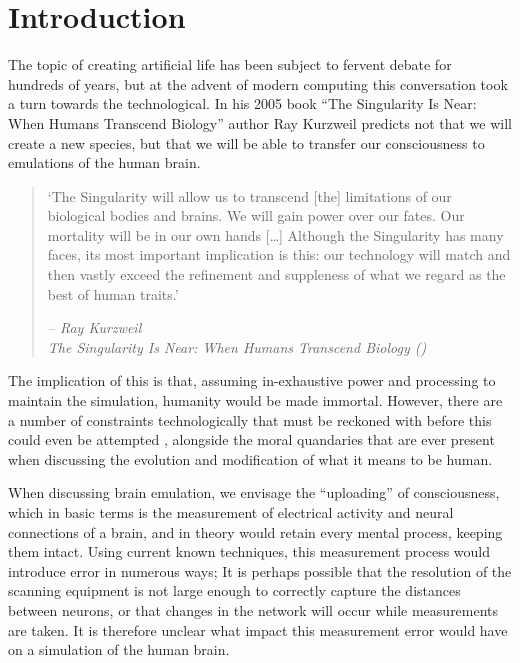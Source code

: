 \chapter{Introduction}


The topic of creating artificial life has been subject to fervent debate for
hundreds of years, but at the advent of modern computing this conversation took
a turn towards the technological. In his 2005 book “The Singularity Is Near:
When Humans Transcend Biology” author Ray Kurzweil predicts not that we will
create a new species, but that we will be able to transfer our
consciousness to emulations of the human brain.\autocite{kurzweil_singularity_2006}

\begin{quote}
      `The Singularity will allow us to transcend [the] limitations of our
      biological bodies and brains. We will gain power over our fates. Our
      mortality will be in our own hands [\ldots] Although the Singularity has many faces, its most important implication is this: our technology will match and then vastly exceed the refinement and suppleness of what we regard as the best of human traits.'
\begin{flushright}
      \textit{-- Ray Kurzweil \\ The Singularity Is Near: When Humans Transcend
      Biology (\citeyear{kurzweil_singularity_2006})
      }
  \end{flushright}
\end{quote}  

The implication of this is
that, assuming in-exhaustive power and processing to maintain the simulation,
humanity would be made immortal. However, there are a number of constraints
technologically that must be reckoned with before this could even be attempted
\parencite{bostrom_whole_2008}, alongside the moral quandaries that are ever
present when discussing the evolution and modification of what it means to be
human.

When discussing brain emulation, we envisage the “uploading” of consciousness,
which in basic terms is the measurement of electrical activity and neural
connections of a brain, and in theory would retain every mental process, keeping
them intact. Using current known techniques, this measurement process would
introduce error in numerous ways; It is perhaps possible that the resolution of
the scanning equipment is not large enough to correctly capture the distances
between neurons, or that changes in the network will occur while measurements
are taken. It is therefore unclear what impact this measurement error would have
on a simulation of the human brain.

